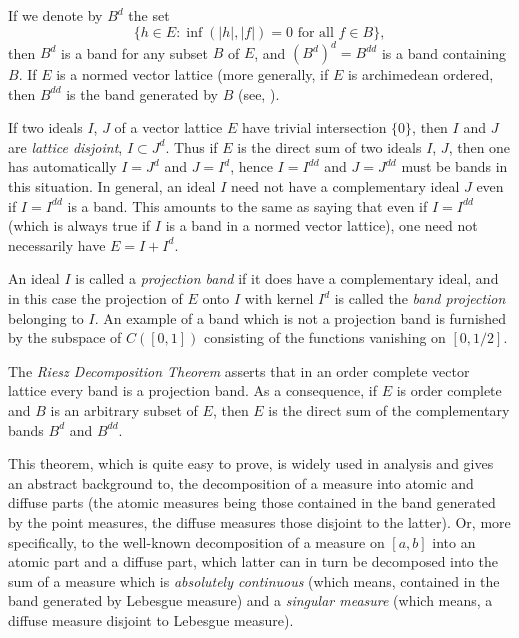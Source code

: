 If we denote by $ B^{d} $ the set 
\[
\{h \in E \colon \inf(|h|,|f|) = 0 \text{ for all $f \in B$}\},
\]
then $ B^{d} $ is a band for any subset $ B $ of $ E $, and $ (B^{d})^{d} = B^{dd} $ is a band containing $ B $.
If $ E $ is a normed vector lattice (more generally, if $ E $ is archimedean ordered, then $ B^{dd} $ is the band generated by $ B $ (see, \eg \citet{schaefer:1974}).

If two ideals $ I $,  $ J $ of a vector lattice $ E $ have trivial intersection $ \{0\} $, then $ I $ and $ J $ are \emph{lattice disjoint}, \ie $ I \subset J^{d} $.
Thus if $ E $ is the direct sum of two ideals $ I $,  $ J $, then one has automatically $ I = J^{d} $ and $ J = I^{d} $, hence $ I = I^{dd} $ and $ J = J^{dd} $ must be bands in this situation.
In general, an ideal $ I $ need not have a complementary ideal $ J $ even if $ I = I^{dd} $ is a band.
This amounts to the same as saying that even if $ I = I^{dd} $ (which is always true if $ I $ is a band in a normed vector lattice), one need not necessarily have $ E = I + I^{d} $.

An ideal $ I $ is called a \emph{projection band} if it does have a complementary ideal, and in this case the projection of $ E $ onto $ I $ with kernel $ I^{d} $ is called the \emph{band projection} belonging to $ I $.
An example of a band which is not a projection band is furnished by the subspace of $ C([0,1]) $ consisting of the functions vanishing on $ [0,1/2] $.

The \emph{Riesz Decomposition Theorem} asserts that in an order complete vector lattice every band is a projection band.
As a consequence, if $ E $ is order complete and $ B $ is an arbitrary subset of $ E $, then $ E $ is the direct sum of the complementary bands $ B^{d} $ and $ B^{dd} $.

This theorem, which is quite easy to prove, is widely used in analysis and gives an abstract background to, \eg the decomposition of a measure into atomic and diffuse parts (the atomic measures being those contained in the band generated by the point measures, the diffuse measures those disjoint to the latter). Or, more specifically, to the well-known decomposition of a measure on $ [a,b] $ into an atomic part and a diffuse part, which latter can in turn be decomposed into the sum of a measure which is \emph{absolutely continuous} (which means, contained in the band generated by Lebesgue measure) and a \emph{singular measure} (which means, a diffuse measure disjoint to Lebesgue measure).

